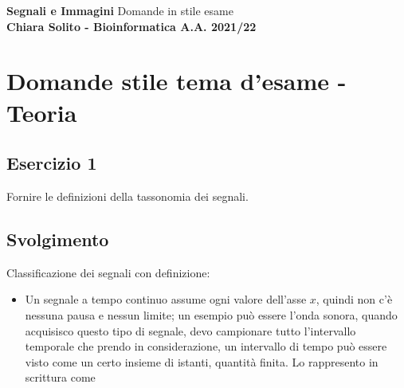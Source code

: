 \documentclass{article}
\begin{document}
    \begin{center}
        \vspace{0.5cm}
        \LARGE
        \textbf{Segnali e Immagini}
        Domande in stile esame\\
        \vspace{0.5cm}
        \small
        \textbf{Chiara Solito - Bioinformatica A.A. 2021/22}
    \end{center}


\section*{Domande stile tema d'esame - Teoria}

\subsection*{Esercizio 1}
Fornire le definizioni della tassonomia dei segnali.
\subsection*{Svolgimento}
Classificazione dei segnali con definizione:
\begin{itemize}
    \item Un segnale a tempo continuo assume ogni valore dell’asse $x$, quindi non c’è nessuna pausa e nessun limite; un
    esempio può essere l’onda sonora, quando acquisisco questo tipo di segnale, devo campionare tutto l’intervallo
    temporale che prendo in considerazione, un intervallo di tempo può essere visto come un certo insieme di istanti,
    quantità finita. Lo rappresento in scrittura come
\end{itemize}
\end{document}
